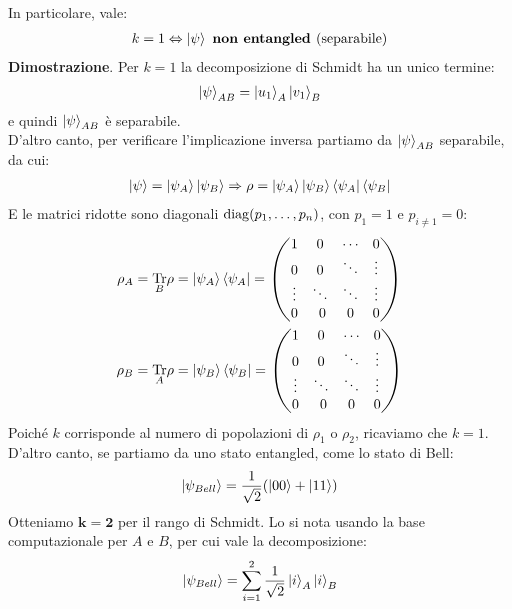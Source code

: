 \documentclass[../../InformazioneQuantistica.tex]{subfiles}
\begin{document}
In particolare, vale:
\begin{align*}
k=1 \Leftrightarrow \Ket{\psi} \text{ \textbf{non entangled }(separabile)}
\end{align*}
\textbf{Dimostrazione}.
Per $k=1$ la decomposizione di Schmidt ha un unico termine:
\begin{align*}
\Ket{\psi}_{AB} = \Ket{u_1}_A\Ket{v_1}_B
\end{align*}
e quindi $\Ket{\psi}_{AB}$ è separabile.\\
D'altro canto, per verificare l'implicazione inversa partiamo da $\Ket{\psi}_{AB}$ separabile, da cui:
\begin{align*}
\Ket{\psi}=\Ket{\psi_A} \Ket{\psi_B} \Rightarrow \rho = \Ket{\psi_A}\Ket{\psi_B} \Bra{\psi_A}\Bra{\psi_B}
\end{align*}
E le matrici ridotte sono diagonali $\operatorname{diag}(p_1, \dots, p_n)$, con $p_1=1$ e $p_{i\neq 1} = 0$:
\begin{align*}
\rho_A &= \underset{B}{\operatorname{Tr}}\rho = \Ket{\psi_A}\Bra{\psi_A}=\begin{pmatrix}
1 & 0 & \cdots & 0\\
0 & 0 & \ddots & \vdots\\
\vdots & \ddots & \ddots & \vdots\\
0 &\ 0 & 0 & 0
\end{pmatrix}\\
\rho_B &= \underset{A}{\operatorname{Tr}}\rho = \Ket{\psi_B}\Bra{\psi_B}=\begin{pmatrix}
1 & 0 & \cdots & 0\\
0 & 0 & \ddots & \vdots\\
\vdots & \ddots & \ddots & \vdots\\
0 &\ 0 & 0 & 0
\end{pmatrix}
\end{align*}
Poiché $k$ corrisponde al numero di popolazioni di $\rho_1$ o $\rho_2$, ricaviamo che $k=1$.\\


D'altro canto, se partiamo da uno stato entangled, come lo stato di Bell: 
\begin{align*}
\Ket{\psi_{Bell}}=\frac{1}{\sqrt{2}}(\Ket{00}+\Ket{11}) 
\end{align*}
Otteniamo $\bm{k=2}$ per il rango di Schmidt. Lo si nota usando la base computazionale per $A$ e $B$, per cui vale la decomposizione:
\begin{align*}
\Ket{\psi_{Bell}} = \sum_{i=1}^2 \frac{1}{\sqrt{2}}\Ket{i}_A \Ket{i}_B
\end{align*}
\end{document}
